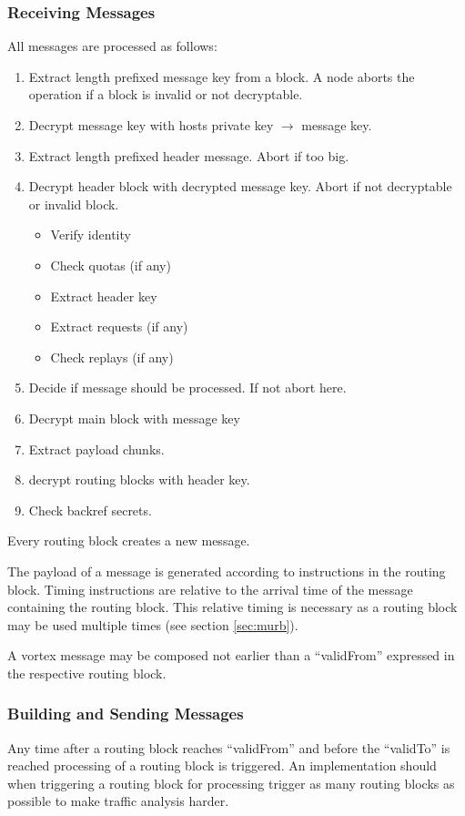 \subsubsection{Receiving Messages}
All messages are processed as follows:
\begin{enumerate}
	\item Extract length prefixed message key from a block. A node aborts the operation if a block is invalid or not decryptable.
	\item Decrypt message key with hosts private key $\rightarrow$ message key.
	\item Extract length prefixed header message. Abort if too big.
	\item Decrypt header block with decrypted message key. Abort if not decryptable or invalid block.
	\begin{itemize}
		\item Verify identity
		\item Check quotas (if any)
		\item Extract header key
		\item Extract requests (if any)
		\item Check replays (if any)
	\end{itemize}
	\item Decide if message should be processed. If not abort here.
	\item Decrypt main block with message key
	\item Extract payload chunks.
	\item decrypt routing blocks with header key.
	\item Check backref secrets.
\end{enumerate}

Every routing block creates a new message.

The payload of a message is generated according to instructions in the routing block. Timing instructions are relative to the arrival time of the message containing the routing block. This relative timing is necessary as a routing block may be used multiple times (see section \ref{sec:murb}).

A vortex message may be composed not earlier than a ``validFrom'' expressed in the respective routing block.

\subsubsection{Building and Sending Messages}
Any time after a routing block reaches ``validFrom'' and before the ``validTo'' is reached processing of a routing block is triggered. An implementation should when triggering a routing block for processing trigger as many routing blocks as possible to make traffic analysis harder.

